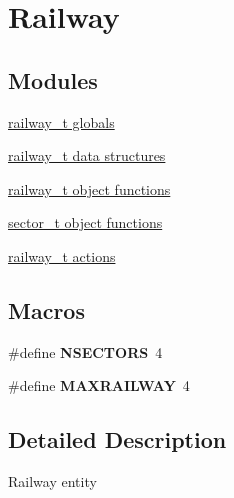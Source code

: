 \hypertarget{group__railway}{\section{Railway}
\label{group__railway}
}
\subsection*{Modules}
\begin{DoxyCompactItemize}
\item 
\hyperlink{group__railway__t__globals}{railway\-\_\-t globals}
\item 
\hyperlink{group__railway__t__structs}{railway\-\_\-t data structures}
\item 
\hyperlink{group__railway__t__object}{railway\-\_\-t object functions}
\item 
\hyperlink{group__sector__t__object}{sector\-\_\-t object functions}
\item 
\hyperlink{group__railway__t__actions}{railway\-\_\-t actions}
\end{DoxyCompactItemize}
\subsection*{Macros}
\begin{DoxyCompactItemize}
\item 
\hypertarget{group__railway_ga326d55cc0f136e0a333b7b4e895e80ec}{\#define {\bfseries N\-S\-E\-C\-T\-O\-R\-S}~4}\label{group__railway_ga326d55cc0f136e0a333b7b4e895e80ec}

\item 
\hypertarget{group__railway_gae4a404d0903742080b009983469f15ee}{\#define {\bfseries M\-A\-X\-R\-A\-I\-L\-W\-A\-Y}~4}\label{group__railway_gae4a404d0903742080b009983469f15ee}

\end{DoxyCompactItemize}


\subsection{Detailed Description}
Railway entity 